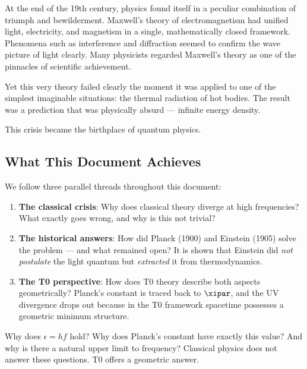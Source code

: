 At the end of the 19th century, physics found itself in a peculiar combination of 
triumph and bewilderment. Maxwell's theory of electromagnetism had unified light, 
electricity, and magnetism in a single, mathematically closed framework. Phenomena 
such as interference and diffraction seemed to confirm the wave picture of light 
clearly. Many physicists regarded Maxwell's theory as one of the pinnacles of 
scientific achievement.

Yet this very theory failed clearly the moment it was applied to one of the 
simplest imaginable situations: the thermal radiation of hot bodies. The result was 
a prediction that was physically absurd — infinite energy density.

This crisis became the birthplace of quantum physics.

\subsection{What This Document Achieves}

We follow three parallel threads throughout this document:

\begin{enumerate}
    \item \textbf{The classical crisis}: Why does classical theory diverge at high 
    frequencies? What exactly goes wrong, and why is this not trivial?
    
    \item \textbf{The historical answers}: How did Planck (1900) and Einstein (1905) 
    solve the problem — and what remained open? It is shown that Einstein did 
    \emph{not postulate} the light quantum but \emph{extracted} it from thermodynamics.
    
    \item \textbf{The T0 perspective}: How does T0 theory describe both aspects 
    geometrically? Planck's constant is traced back to $\xipar$, and the UV divergence 
    drops out because in the T0 framework spacetime possesses a geometric minimum structure.
\end{enumerate}

\begin{important}
    Why does $\epsilon = hf$ hold? Why does Planck's constant have exactly this value? 
    And why is there a natural upper limit to frequency? Classical physics does not 
    answer these questions. T0 offers a geometric answer.
\end{important}

